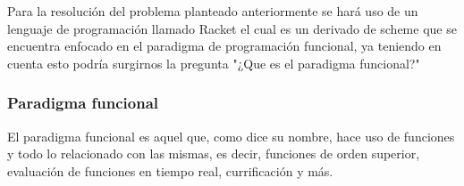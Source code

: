 Para la resolución del problema planteado anteriormente se hará uso de un lenguaje
 de programación llamado Racket el cual es un derivado de scheme que se encuentra
  enfocado en el paradigma de programación funcional, ya teniendo en cuenta
   esto podría surgirnos la pregunta "¿Que es el paradigma funcional?" 

   \subsubsection{Paradigma funcional}
   El paradigma funcional es aquel que, como dice su nombre, hace uso de funciones y
   todo lo relacionado con las mismas, es decir, funciones de orden superior, evaluación
    de funciones en tiempo real, currificación y más.

